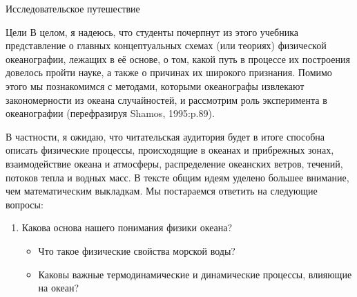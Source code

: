 \begin{chapter}{Исследовательское путешествие}
\begin{section}{Цели}
В целом, я надеюсь, что студенты почерпнут из этого учебника
представление о главных концептуальных схемах (или теориях) физической 
океанографии, лежащих в её основе, о том, какой путь в процессе их построения 
довелось пройти науке, а также о причинах их широкого признания. Помимо этого 
мы познакомимся с методами, которыми океанографы извлекают закономерности из
океана случайностей, и рассмотрим роль эксперимента в океанографии
(перефразируя Shamos, 1995:p.89).
%

В частности, я ожидаю, что читательская аудитория будет в итоге способна 
описать физические процессы, происходящие в океанах и прибрежных зонах, 
взаимодействие океана и атмосферы, распределение океанских ветров, течений, 
потоков тепла и водных масс. В тексте общим идеям уделено большее внимание, 
чем математическим выкладкам. Мы постараемся ответить на следующие вопросы:
%

\begin{enumerate}
\item
Какова основа нашего понимания физики океана?
%

\begin{itemize}
  \item
  Что такое физические свойства морской воды? 
%

  \item
  Каковы важные термодинамические и динамические процессы, влияющие на океан? 
%


\end{itemize}
\end{enumerate}
\end{section}
\end{chapter}
